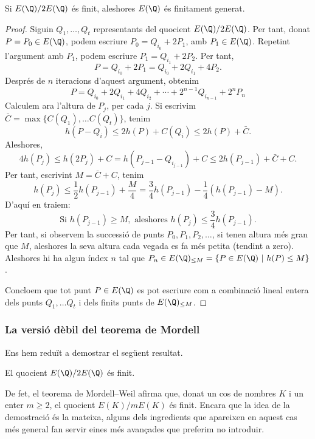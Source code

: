 \begin{theorem}
Si $E(\Q)/2E(\Q)$ és finit, aleshores $E(\Q)$ és finitament generat.
\end{theorem}
\begin{proof}
Siguin $Q_1,\ldots, Q_t$ representants del quocient $E(\Q)/2E(\Q)$.
Per tant, donat $P=P_0\in E(\Q)$, podem escriure $P_0 = Q_{i_0} + 2P_1$, amb $P_1\in E(\Q)$. Repetint l'argument amb $P_1$, podem escriure $P_1 = Q_{i_1} + 2P_2$. Per tant,
\[
P = Q_{i_0} + 2P_1 = Q_{i_0} + 2Q_{i_1} + 4P_2.
\]
Després de $n$ iteracions d'aquest argument, obtenim
\[
P = Q_{i_0} + 2Q_{i_1} + 4Q_{i_2}+\cdots +2^{n-1} Q_{i_{n-1}} + 2^{n}P_n
\]
Calculem ara l'altura de $P_j$, per cada $j$. Si escrivim $\bar C = \max\{ C(Q_1),\ldots C(Q_t)\}$, tenim
\[
h(P - Q_i) \leq 2h(P) + C(Q_i)\leq 2h(P) + \bar C.
\]
Aleshores,
\[
4h(P_j)\leq h(2P_j) + C = h(P_{j-1} - Q_{i_{j-1}}) + C\leq 2h(P_{j-1}) + \bar C + C.
\]
Per tant, escrivint $M=\bar C + C$, tenim
\[
h(P_j)\leq \frac{1}{2} h(P_{j-1}) + \frac{M}{4} = \frac{3}{4} h(P_{j-1}) - \frac 14\left(h(P_{j-1}) - M\right).
\]
D'aquí en traiem:
\[
\text{Si } h(P_{j-1})\geq M,\text{ aleshores } h(P_j)\leq \frac 34 h(P_{j-1}).
\]
Per tant, si observem la successió de punts $P_0, P_1, P_2, \ldots$, si tenen altura més gran que $M$, aleshores la seva altura cada vegada es fa més petita (tendint a zero). Aleshores hi ha algun índex $n$ tal que $P_n\in E(\Q)_{\leq M} = \{ P\in E(\Q) ~|~ h(P) \leq M\}$.

Concloem que tot punt $P\in E(\Q)$ es pot escriure com a combinació lineal entera dels punts $Q_1,\ldots Q_t$ i dels finits punts de $E(\Q)_{\leq M}$.
\end{proof}

 \subsubsection{La versió dèbil del teorema de Mordell}
 Ens hem reduït a demostrar el següent resultat.
 \begin{theorem}
 El quocient $E(\Q)/2E(\Q)$ és finit.
 \end{theorem}
 \begin{remark}
 De fet, el teorema de Mordell--Weil afirma que, donat un cos de nombres $K$ i un enter $m\geq 2$, el quocient $E(K)/mE(K)$ és finit. Encara que la idea de la demostració és la mateixa, alguns dels ingredients que apareixen en aquest cas més general fan servir eines més avançades que preferim no introduir.
 \end{remark}
 

